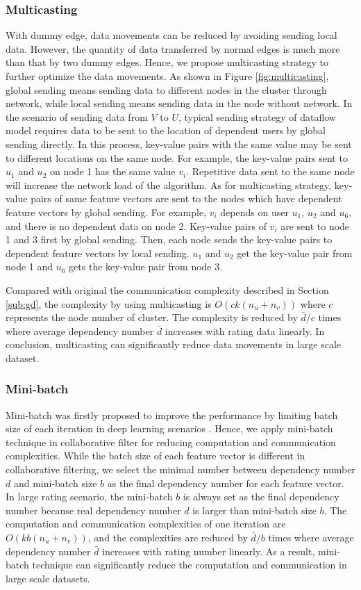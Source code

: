 \documentclass{llncs}
\begin{document}
\subsubsection{Multicasting}
With dummy edge, data movements can be reduced by avoiding sending local data. However, the quantity of data transferred by normal edges is much more than that by two dummy edges. Hence, we propose multicasting strategy to further optimize the data movements. As shown in Figure \ref{fig:multicasting}, global sending means sending data to different nodes in the cluster through network, while local sending means sending data in the node without network. In the scenario of sending data from $V$ to $U$, typical sending strategy of dataflow model requires data to be sent to the location of dependent users by global sending directly. In this process, key-value pairs with the same value may be sent to different locations on the same node. For example, the key-value pairs sent to $u_1$ and $u_2$ on node 1 has the same value $v_i$. Repetitive data sent to the same node will increase the network load of the algorithm. As for multicasting strategy, key-value pairs of same feature vectors are sent to the nodes which have dependent feature vectors by global sending. For example, $v_i$ depends on user $u_1$, $u_2$ and $u_6$, and there is no dependent data on node 2. Key-value pairs of $v_i$ are sent to node 1 and 3 first by global sending. Then, each node sends the key-value pairs to dependent feature vectors by local sending. $u_1$ and $u_2$ get the key-value pair from node 1 and $u_6$ gets the key-value pair from node 3.

Compared with original the communication complexity described in Section \ref{sub:gd}, the complexity by using multicasting is $O(ck(n_u + n_v))$ where $c$ represents the node number of cluster. The complexity is reduced by $\bar{d}/c$ times where average dependency number $\bar{d}$ increases with rating data linearly. In conclusion, multicasting can significantly reduce data movements in large scale dataset.
\vspace{-15pt}
\subsubsection{Mini-batch}

Mini-batch \cite{Dean2012} was firstly proposed to improve the performance by limiting batch size of each iteration in deep learning scenarios . Hence, we apply mini-batch technique in collaborative filter for reducing computation and communication complexities. While the batch size of each feature vector is different in collaborative filtering, we select the minimal number between dependency number $d$ and mini-batch size $b$ as the final dependency number for each feature vector. In large rating scenario, the mini-batch $b$ is always set as the final dependency number because real dependency number $d$ is larger than mini-batch size $b$. The computation and communication complexities of one iteration are $O(kb(n_u + n_v))$, and the complexities are reduced by $\bar{d}/b$ times where average dependency number $\bar{d}$ increases with rating number linearly. As a result, mini-batch technique can significantly reduce the computation and communication in large scale datasets.
\end{document}

